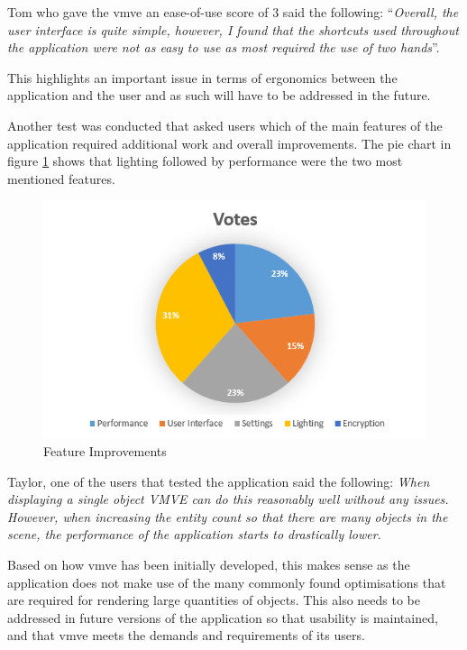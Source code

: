 \documentclass[11pt]{article}
\begin{document}
Tom who gave the \gls*{vmve} an ease-of-use score of 3 said the following:
``\textit{Overall, the user interface is quite simple, however, I found that 
the shortcuts used throughout the application were not as easy to use as most
required the use of two hands}''. 

This highlights an important issue in terms of ergonomics between the
application and the user and as such will have to be addressed in the future.

Another test was conducted that asked users which of the main features of the
application required additional work and overall improvements. The pie chart in
figure \ref{fig:pie_chart_features} shows that lighting followed by performance
were the two most mentioned features.

\begin{figure}[H]
  \centering
  \includegraphics[width=\textwidth]{images/pie_chart_feature_improvements.png}
  \caption{Feature Improvements}
  \label{fig:pie_chart_features}
\end{figure}

Taylor, one of the users that tested the application said the following:
\textit{When displaying a single object VMVE can do this reasonably well without
any issues. However, when increasing the entity count so that there are many
objects in the scene, the performance of the application starts to drastically
lower}.

Based on how \gls*{vmve} has been initially developed, this makes sense as the
application does not make use of the many commonly found optimisations that are
required for rendering large quantities of objects. This also needs to be
addressed in future versions of the application so that usability is maintained,
and that \gls*{vmve} meets the demands and requirements of its users.
\end{document}
